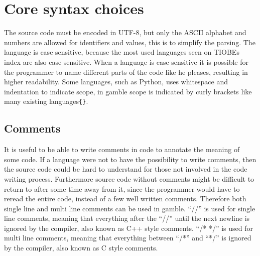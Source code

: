 \section{Core syntax choices}
The source code must be encoded in UTF-8, but only the ASCII alphabet and numbers are allowed for identifiers and values, this is to simplify the parsing. 
The language is case sensitive, because the most used languages seen on TIOBEs index are also case sensitive. \citep{TIOBE}
When a language is case sensitive it is possible for the programmer to name different parts of the code like he pleases, resulting in higher readability. 
Some languages, such as Python, uses whitespace and indentation to indicate scope, in \gls{gamble} scope is indicated by curly brackets like many existing languages\texttt{\{\}}.

\subsection*{Comments}
It is useful to be able to write comments in code to annotate the meaning of some code.
If a language were not to have the possibility to write comments, then the source code could be hard to understand for those not involved in the code writing process.
Furthermore source code without comments might be difficult to return to after some time away from it, since the programmer would have to reread the entire code, instead of a few well written comments. \citep{Commenting}
Therefore both single line and multi line comments can be used in \gls{gamble}. 
``//'' is used for single line comments, meaning that everything after the ``//'' until the next newline is ignored by the compiler, also known as C++ style comments. 
``/* */'' is used for multi line comments, meaning that everything between ``/*'' and ``*/'' is ignored by the compiler, also known as C style comments. \citep{C_comment,Cplus_comment}

